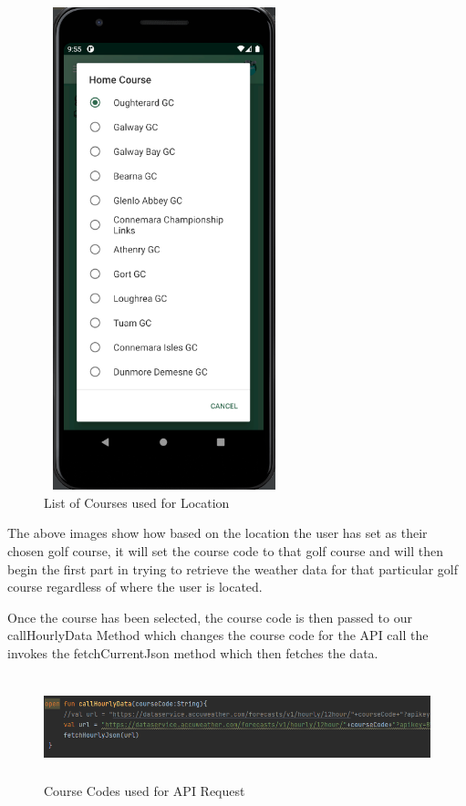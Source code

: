 \begin{figure}[H]
    \centering
    \includegraphics[width=7cm,height = 14cm]{img/InPhoneList.PNG}
    \caption{List of Courses used for Location}
    \label{fig:altas config}
\end{figure}

The above images show how based on the location the user has set as their chosen golf course, it will set the course code to that golf course and will then begin the first part in trying to retrieve the weather data for that particular golf course regardless of where the user is located.

Once the course has been selected, the course code is then passed to our callHourlyData Method which changes the course code for the API call the invokes the fetchCurrentJson method which then fetches the data.

\begin{figure}[H]
    \centering
    \includegraphics[width=16cm,height = 3cm]{img/APICall.PNG}
    \caption{Course Codes used for API Request}
    \label{fig:altas config}
\end{figure}

